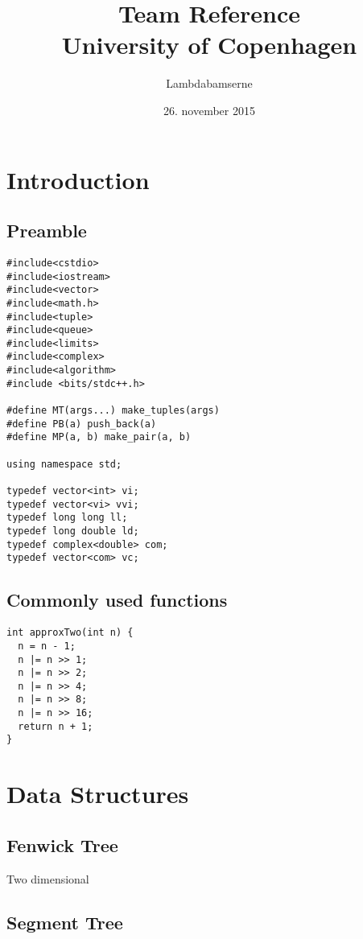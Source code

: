\documentclass[a4paper,11pt]{article}
\title{Team Reference\\
       University of Copenhagen}
\author{Lambdabamserne}
\date{26. november 2015}
\begin{document}
\maketitle
\thispagestyle{fancy}
\tableofcontents

\section{Introduction}
  \subsection{Preamble}
\begin{lstlisting}
#include<cstdio>
#include<iostream>
#include<vector>
#include<math.h>
#include<tuple>
#include<queue>
#include<limits>
#include<complex>
#include<algorithm>
#include <bits/stdc++.h>

#define MT(args...) make_tuples(args)
#define PB(a) push_back(a)
#define MP(a, b) make_pair(a, b)

using namespace std;

typedef vector<int> vi;
typedef vector<vi> vvi;
typedef long long ll;
typedef long double ld;
typedef complex<double> com;
typedef vector<com> vc;
\end{lstlisting}
  
  \subsection{Commonly used functions}
\begin{lstlisting}
int approxTwo(int n) {
  n = n - 1;
  n |= n >> 1;
  n |= n >> 2;
  n |= n >> 4;
  n |= n >> 8;
  n |= n >> 16;
  return n + 1;
}
\end{lstlisting}

\section{Data Structures}
  \subsection{Fenwick Tree}
    
    Two dimensional
    
  
  \subsection{Segment Tree}
        
    
\end{document}

